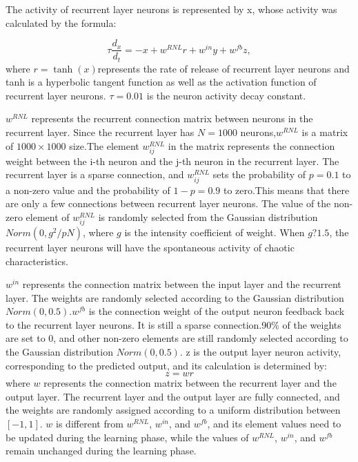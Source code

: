 \documentclass[runningheads]{llncs}
\begin{document}
The activity of recurrent layer neurons is represented by x, 
whose activity was calculated by the formula:

\begin{equation}
\tau \frac{d_x}{d_t}=-x+w^{RNL}r+w^{in}y+w^{fb}z,
\end{equation}
where $r = \tanh(x)$represents the rate of release 
of recurrent layer neurons and tanh is a hyperbolic 
tangent function as well as the activation function of 
recurrent layer neurons. $\tau=0.01$ is the neuron activity
 decay constant.

$w^{RNL}$ represents the recurrent connection matrix between 
neurons in the recurrent layer.
Since the recurrent layer has $N=1000$ neurons,$w^{RNL}$ is a 
matrix of $1000\times1000$ size.The element $w_{ij}^{RNL}$
in the matrix represents the connection weight between 
the i-th neuron and the j-th neuron in the recurrent layer.
The recurrent layer is a sparse connection, and $w_{ij}^{RNL}$
sets the probability of $p=0.1$ to a non-zero value and the 
probability of $1-p=0.9$ to zero.This means that there are only a 
few connections between recurrent layer neurons.
The value of the non-zero element of $w_{ij}^{RNL}$ 
is randomly selected from the Gaussian distribution $Norm(0,g^{2}/pN)$,
where $g$ is the intensity coefficient of weight.
When $g?1.5$, the recurrent layer neurons will have the 
spontaneous activity of chaotic characteristics\cite{RN17}.

$w^{in}$ represents the connection matrix between the 
input layer and the recurrent layer.
The weights are randomly selected according to the 
Gaussian distribution $Norm(0, 0.5)$.$w^{fb}$ is the connection 
weight of the output neuron feedback back to the recurrent layer neurons. 
It is still a sparse connection.90$\%$ of the weights are set to 0, 
and other non-zero elements are still randomly selected according 
to the Gaussian distribution $Norm(0,0.5)$.
z is the output layer neuron activity, corresponding to 
the predicted output, and its calculation is determined by:
\begin{equation}
z=wr
\end{equation}
where $w$ represents the connection matrix between the recurrent layer 
and the output layer. The recurrent layer and the output layer are 
fully connected, and the weights are randomly assigned according 
to a uniform distribution between $\left[-1,1\right]$. 
$w$ is different from $w^{RNL}$, $w^{in}$, and $w^{fb}$, and
its element values need to be updated during the learning phase,
 while the values of $w^{RNL}$, $w^{in}$, and $w^{fb}$ remain unchanged during 
 the learning phase.
\end{document}
